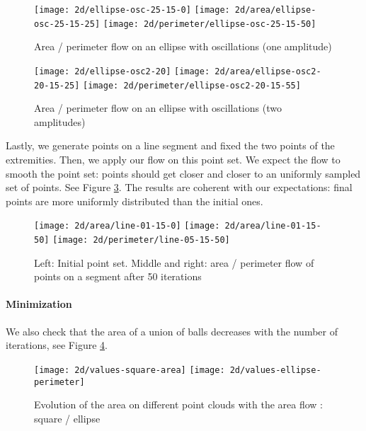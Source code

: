 \begin{figure}[h]
    \centering

    \texttt{[image: 2d/ellipse-osc-25-15-0]}
    \texttt{[image: 2d/area/ellipse-osc-25-15-25]}
    \texttt{[image: 2d/perimeter/ellipse-osc-25-15-50]}
    \caption{Area / perimeter flow on an ellipse with oscillations (one
        amplitude)}

    \label{fig:ellipse_osc_flow}
\end{figure}

\begin{figure}[h]
    \centering

    \texttt{[image: 2d/ellipse-osc2-20]}
    \texttt{[image: 2d/area/ellipse-osc2-20-15-25]}
    \texttt{[image: 2d/perimeter/ellipse-osc2-20-15-55]}
    \caption{Area / perimeter flow on an ellipse with oscillations (two
        amplitudes)}

    \label{fig:ellipse_osc2_flow}
\end{figure}

Lastly, we generate points on a line segment and fixed the two points of the
extremities. Then, we apply our flow on this point set. We expect the flow to
smooth the point set: points should get closer and closer to an uniformly
sampled set of points. See Figure \ref{fig:line_fixed_flow}. The results are
coherent with our expectations: final points are more uniformly distributed than
the initial ones.

\begin{figure}[h]
    \centering

    \texttt{[image: 2d/area/line-01-15-0]}
    \texttt{[image: 2d/area/line-01-15-50]}
    \texttt{[image: 2d/perimeter/line-05-15-50]}
    \caption{Left: Initial point set. Middle and right: area / perimeter flow of
        points on a segment after 50 iterations}

    \label{fig:line_fixed_flow}
\end{figure}

\paragraph{Minimization}

We also check that the area of a union of balls decreases with the number of
iterations, see Figure \ref{fig:area_time_decrease}.

\begin{figure}[h]
    \centering
    \texttt{[image: 2d/values-square-area]}
    \texttt{[image: 2d/values-ellipse-perimeter]}
    \caption{Evolution of the area on different point clouds with the area
        flow : square / ellipse}
    \label{fig:area_time_decrease}
\end{figure}

